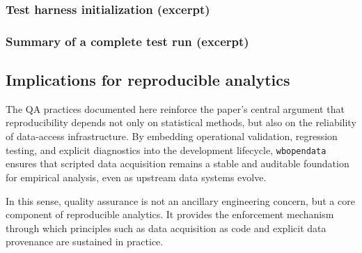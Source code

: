 \documentclass[bib]{statapress}
\begin{document}
\subsubsection{Test harness initialization (excerpt)}
\begin{stlog}
\nullskip
\end{stlog}

\subsubsection{Summary of a complete test run (excerpt)}
\begin{stlog}
\nullskip
\end{stlog}

\subsection{Implications for reproducible analytics}

The QA practices documented here reinforce the paper’s central argument that
reproducibility depends not only on statistical methods, but also on the
reliability of data-access infrastructure. By embedding operational validation,
regression testing, and explicit diagnostics into the development lifecycle,
\texttt{wbopendata} ensures that scripted data acquisition remains a stable and
auditable foundation for empirical analysis, even as upstream data systems
evolve.

In this sense, quality assurance is not an ancillary engineering concern, but a
core component of reproducible analytics. It provides the enforcement mechanism
through which principles such as data acquisition as code and explicit data
provenance are sustained in practice.
\end{document}
